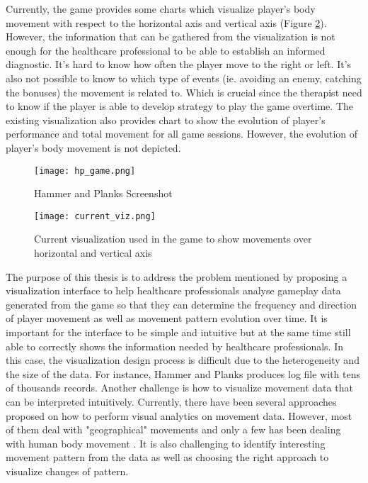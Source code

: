 Currently, the game provides some charts which visualize player's body movement with respect to the horizontal axis and vertical axis (Figure \ref{current_viz}). However, the information that can be gathered from the visualization is not enough for the healthcare professional to be able to establish an informed diagnostic. It's hard to know how often the player move to the right or left. It's also not possible to know to which type of events (ie. avoiding an enemy, catching the bonuses) the movement is related to. Which is crucial since the therapist need to know if the player is able to develop strategy to play the game overtime. The existing visualization also provides chart to show the evolution of player's performance and total movement for all game sessions. However, the evolution of player's body movement is not depicted.

\begin{figure}[H]
\centering
\texttt{[image: hp\_game.png]}
\caption{Hammer and Planks Screenshot \label{game_screenshot}}
\end{figure}

\begin{figure}[H]
\centering
\texttt{[image: current\_viz.png]}
\caption{Current visualization used in the game to show movements over horizontal and vertical axis \label{current_viz}}
\end{figure}

The purpose of this thesis is to address the problem mentioned by proposing a visualization interface to help healthcare professionals analyse gameplay data generated from the game so that they can determine the frequency and direction of player movement as well as movement pattern evolution over time. It is important for the interface to be simple and intuitive but at the same time still able to correctly shows the information needed by healthcare professionals. In this case, the visualization design process is difficult due to the heterogeneity and the size of the data. For instance, Hammer and Planks produces log file with tens of thousands records. Another challenge is how to visualize movement data that can be interpreted intuitively. Currently, there have been several approaches proposed on how to perform visual analytics on movement data. However, most of them deal with "geographical" movements \cite{adrienko_book} and only a few has been dealing with human body movement \cite{bernard2013}. It is also challenging to identify interesting movement pattern from the data as well as choosing the right approach to visualize changes of pattern.
